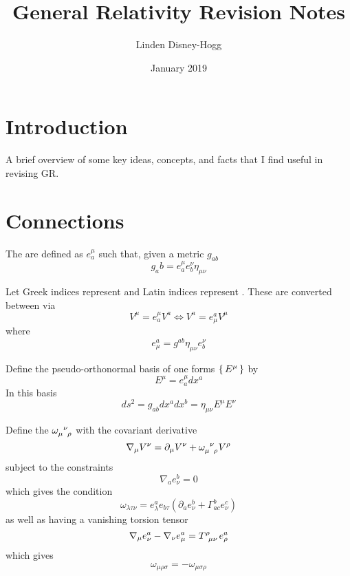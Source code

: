 \documentclass{article}
\title{General Relativity Revision Notes}
\author{Linden Disney-Hogg}
\date{January 2019}
\begin{document}
\maketitle
\tableofcontents

\section{Introduction}
A brief overview of some key ideas, concepts, and facts that I find useful in revising GR.
\section{Connections}

\begin{definition}
The  are defined as $e^\mu_a$ such that, given a metric $g_{ab}$
\[
g_ab = e^\mu_a e^\nu_b \eta_{\mu\nu}
\]
\end{definition}

\begin{definition}
Let Greek indices represent  and Latin indices represent . These are converted between via 
\[
V^\mu = e^\mu_a V^a \Leftrightarrow V^a = e^a_\mu V^\mu
\]
where 
\[
e^a_\mu=g^{ab} \eta_{\mu\nu} e^\nu_b
\]
\end{definition}

\begin{definition}
Define the pseudo-orthonormal basis of one forms $\set{E^\mu}$ by 
\[
E^\mu = e^\mu_a dx^a
\]
In this basis 
\[
ds^2 = g_{ab} dx^a dx^b = \eta_{\mu\nu} E^{\mu} E^{\nu}
\]
\end{definition}

\begin{definition}
Define the  $\omega\indices{_\mu^\nu_\rho}$ with the covariant derivative 
\[
\nabla_\mu V^\nu = \del_\mu V^\nu + \omega\indices{_\mu^\nu_\rho} V^\rho
\]
subject to the constraints
\[
\nabla_a e^b_\nu = 0
\]
which gives the condition
\[
\omega_{\lambda\tau\nu} =e_\lambda^a e_{b\tau}\left(\partial_a e_\nu^b+\Gamma_{ac}^b e_\nu^c \right)
\]
as well as having a vanishing torsion tensor 
\[
\nabla_\mu e^a_\nu - \nabla_\nu e^a_\mu = T\indices{^\rho_\mu_\nu} e^a_\rho
\]
which gives 
\[
\omega_{\mu\rho\sigma} = -\omega_{\mu\sigma\rho}
\]
\end{definition}
\end{document}

